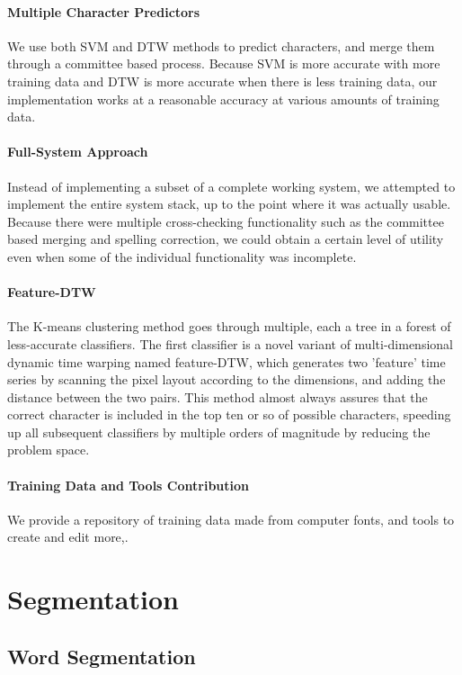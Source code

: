 \documentclass[12pt]{article}
\begin{document}
	\paragraph{Multiple Character Predictors} We use both SVM and DTW methods to predict characters, and merge them through a committee based process. Because SVM is more accurate with more training data and DTW is more accurate when there is less training data, our implementation works at a reasonable accuracy at various amounts of training data.
	
	\paragraph{Full-System Approach} Instead of implementing a subset of a complete working system, we attempted to implement the entire system stack, up to the point where it was actually usable. Because there were multiple cross-checking functionality such as the committee based merging and spelling correction, we could obtain a certain level of utility even when some of the individual functionality was incomplete.
	
	\paragraph{Feature-DTW} The K-means clustering method goes through multiple, each a tree in a forest of less-accurate classifiers. The first classifier is a novel variant of multi-dimensional dynamic time warping named feature-DTW, which generates two 'feature' time series by scanning the pixel layout according to the dimensions, and adding the distance between the two pairs. This method almost always assures that the correct character is included in the top ten or so of possible characters, speeding up all subsequent classifiers by multiple orders of magnitude by reducing the problem space.
	
	\paragraph{Training Data and Tools Contribution} We provide a repository of training data made from computer fonts, and tools to create and edit more,.

\section{Segmentation}
\label{section:segmentation}
	\subsection{Word Segmentation}
\end{document}
